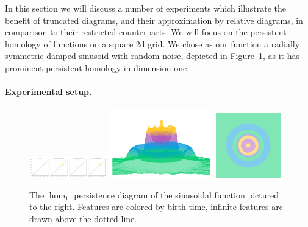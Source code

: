 
In this section we will discuss a number of experiments which illustrate the benefit of truncated diagrams, and their approximation by relative diagrams, in comparison to their restricted counterparts.
We will focus on the persistent homology of functions on a square 2d grid.%
We chose as our function a radially symmetric damped sinusoid with random noise, depicted in Figure~\ref{fig:ripple1}, as it has prominent persistent homology in dimension one.

\paragraph*{Experimental setup.}

\begin{figure}[htbp]
  \centering
  \includegraphics[trim=0 0 790 0, clip, width=0.3\textwidth]{scripts/figures/matching2/full-dgm.pdf}
  \includegraphics[trim=-350 -800 -700 -300, clip, width=0.4\textwidth]{scripts/figures/matching2/full-surf_side-lowres.png}
  \includegraphics[trim=0 -800 0 0, width=0.25\textwidth]{scripts/figures/matching2/full-surf_top-lowres.png}
  \caption{The $\hom_1$ persistence diagram of the sinusoidal function pictured to the right.
  Features are colored by birth time, infinite features are drawn above the dotted line.}\label{fig:ripple1}
\end{figure}

